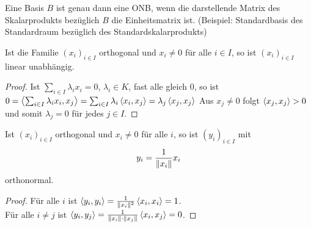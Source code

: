 \begin{remark}
	Eine Basis $B$ ist genau dann eine ONB, wenn die darstellende Matrix des Skalarprodukts bezüglich $B$ die Einheitsmatrix ist. (Beispiel: Standardbasis des Standardraum bezüglich des Standardskalarprodukts)
\end{remark}

\begin{lemma}
	Ist die Familie $(x_i)_{i\in I}$ orthogonal und $x_i\neq 0$ für alle $i\in I$, so ist $(x_i)_{i\in I}$ linear unabhängig.
\end{lemma}
\begin{proof}
	Ist $\sum_{i\in I} \lambda_i x_i=0$, $\lambda_i\in K$, fast alle gleich 0, so ist $0=\left\langle \sum_{i\in I} \lambda_i x_i,x_j\right\rangle=\sum_{i\in I} \lambda_i\left\langle x_i,x_j\right\rangle=\lambda_j\left\langle x_j,x_j\right\rangle$ Aus $x_j\neq 0$ folgt $\left\langle x_j,x_j\right\rangle>0$ und somit $\lambda_j=0$ für jedes $j\in I$.
\end{proof}

\begin{lemma}
	Ist $(x_i)_{i\in I}$ orthogonal und $x_i\neq 0$ für alle $i$, so ist $(y_i)_{i\in I}$ mit
	\begin{align}
		y_i=\frac{1}{\Vert x_i\Vert}x_i\notag
	\end{align}
	orthonormal.
\end{lemma}
\begin{proof}
	Für alle $i$ ist $\left\langle y_i,y_i\right\rangle=\frac{1}{\Vert x_i\Vert^2}\left\langle x_i,x_i\right\rangle=1$. \\
	Für alle $i\neq j$ ist $\left\langle y_i,y_j\right\rangle=\frac{1}{\Vert x_i\Vert\cdot \Vert x_j\Vert}\left\langle x_i,x_j\right\rangle=0$.
\end{proof}

